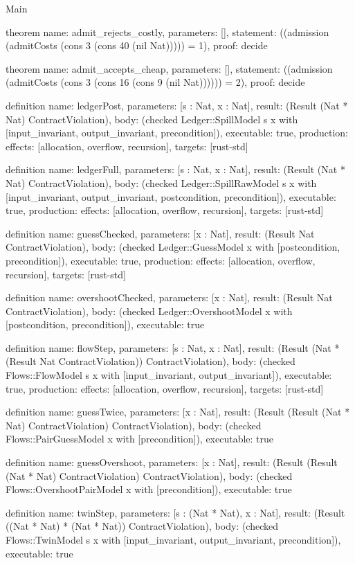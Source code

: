 \begin{lexlean}{Main}
\begin{semanticmodule}
theorem{
  name: admit_rejects_costly,
  parameters: [],
  statement: ((admission (admitCosts (cons 3 (cons 40 (nil Nat))))) = 1),
  proof: decide{}
}

theorem{
  name: admit_accepts_cheap,
  parameters: [],
  statement: ((admission (admitCosts (cons 3 (cons 16 (cons 9 (nil Nat)))))) = 2),
  proof: decide{}
}

definition{
  name: ledgerPost,
  parameters: [s : Nat, x : Nat],
  result: (Result (Nat * Nat) ContractViolation),
  body: (checked Ledger::SpillModel s x with [input_invariant, output_invariant, precondition]),
  executable: true,
  production: {effects: [allocation, overflow, recursion], targets: [rust-std]}
}

definition{
  name: ledgerFull,
  parameters: [s : Nat, x : Nat],
  result: (Result (Nat * Nat) ContractViolation),
  body: (checked Ledger::SpillRawModel s x with [input_invariant, output_invariant, postcondition, precondition]),
  executable: true,
  production: {effects: [allocation, overflow, recursion], targets: [rust-std]}
}

definition{
  name: guessChecked,
  parameters: [x : Nat],
  result: (Result Nat ContractViolation),
  body: (checked Ledger::GuessModel x with [postcondition, precondition]),
  executable: true,
  production: {effects: [allocation, overflow, recursion], targets: [rust-std]}
}

definition{
  name: overshootChecked,
  parameters: [x : Nat],
  result: (Result Nat ContractViolation),
  body: (checked Ledger::OvershootModel x with [postcondition, precondition]),
  executable: true
}

definition{
  name: flowStep,
  parameters: [s : Nat, x : Nat],
  result: (Result (Nat * (Result Nat ContractViolation)) ContractViolation),
  body: (checked Flows::FlowModel s x with [input_invariant, output_invariant]),
  executable: true,
  production: {effects: [allocation, overflow, recursion], targets: [rust-std]}
}

definition{
  name: guessTwice,
  parameters: [x : Nat],
  result: (Result (Result (Nat * Nat) ContractViolation) ContractViolation),
  body: (checked Flows::PairGuessModel x with [precondition]),
  executable: true
}

definition{
  name: guessOvershoot,
  parameters: [x : Nat],
  result: (Result (Result (Nat * Nat) ContractViolation) ContractViolation),
  body: (checked Flows::OvershootPairModel x with [precondition]),
  executable: true
}

definition{
  name: twinStep,
  parameters: [s : (Nat * Nat), x : Nat],
  result: (Result ((Nat * Nat) * (Nat * Nat)) ContractViolation),
  body: (checked Flows::TwinModel s x with [input_invariant, output_invariant, precondition]),
  executable: true
}


\end{semanticmodule}
\end{lexlean}
